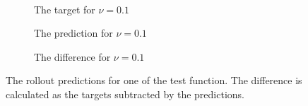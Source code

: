 \documentclass[preprint,12pt,times,authoryear]{elsarticle}
\begin{document}
\begin{figure}[H]
\begin{adjustwidth}{-0.1\linewidth}{-0.1\linewidth}
\begin{subfigure}{0.32\linewidth}
    \end{subfigure}
    \\[0.7\baselineskip]
    \begin{subfigure}{0.33\linewidth}
      \begin{adjustbox}{width=\linewidth}
        
      \end{adjustbox}
      \caption{The target for \(\nu=0.1\)}\label{fig:sc2_rollout_target_0.1}
    \end{subfigure}
    \begin{subfigure}{0.33\linewidth}
      \begin{adjustbox}{width=\linewidth}
        
      \end{adjustbox}
      \caption{The prediction for \(\nu=0.1\)}\label{fig:sc2_rollout_pred_0.1}
    \end{subfigure}
    \begin{subfigure}{0.32\linewidth}
      \begin{adjustbox}{width=\linewidth}
        
      \end{adjustbox}
      \caption{The difference for \(\nu=0.1\)}\label{fig:sc2_rollout_diff_0.1}
    \end{subfigure}
  \end{adjustwidth}
  \caption{The rollout predictions for one of the test function. The difference is calculated as the targets subtracted by the predictions.}\label{fig:scenario_2_rollout}
\end{figure}
\end{document}
